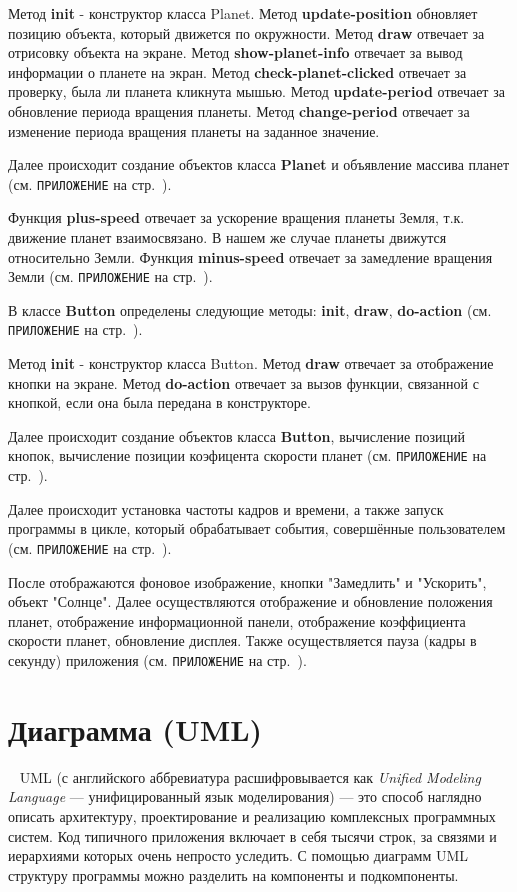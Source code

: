 \documentclass[14pt, oneside]{altsu-report}
\begin{document}
Метод \textbf{init} - конструктор класса Planet. Метод \textbf{update-position} обновляет позицию объекта, который движется по окружности. Метод \textbf{draw} отвечает за отрисовку объекта на экране. Метод \textbf{show-planet-info} отвечает за вывод информации о планете на экран. Метод \textbf{check-planet-clicked} отвечает за проверку, была ли планета кликнута мышью. Метод \textbf{update-period} отвечает за обновление периода вращения планеты. Метод \textbf{change-period} отвечает за изменение периода вращения планеты на заданное значение.

Далее происходит создание объектов класса \textbf{Planet} и объявление массива планет (см. \texttt{ПРИЛОЖЕНИЕ} на стр.~\pageref{code:solar-sys}).

Функция \textbf{plus-speed} отвечает за ускорение вращения планеты Земля, т.к. движение планет взаимосвязано. В нашем же случае планеты движутся относительно Земли. Функция \textbf{minus-speed} отвечает за замедление вращения Земли (см. \texttt{ПРИЛОЖЕНИЕ} на стр.~\pageref{code:solar-sys}).

В классе \textbf{Button} определены следующие методы: \textbf{init}, \textbf{draw}, \textbf{do-action} (см. \texttt{ПРИЛОЖЕНИЕ} на стр.~\pageref{code:solar-sys}).

Метод \textbf{init} - конструктор класса Button. Метод \textbf{draw} отвечает за отображение кнопки на экране. Метод \textbf{do-action} отвечает за вызов функции, связанной с кнопкой, если она была передана в конструкторе.

Далее происходит создание объектов класса \textbf{Button}, вычисление позиций кнопок, вычисление позиции коэфицента скорости планет (см. \texttt{ПРИЛОЖЕНИЕ} на стр.~\pageref{code:solar-sys}).

Далее происходит установка частоты кадров и времени, а также запуск программы в цикле, который обрабатывает события, совершённые пользователем (см. \texttt{ПРИЛОЖЕНИЕ} на стр.~\pageref{code:solar-sys}).

После отображаются фоновое изображение, кнопки "Замедлить" и "Ускорить", объект "Солнце". Далее осуществляются отображение и обновление положения планет, отображение информационной панели, отображение коэффициента скорости планет, обновление дисплея. Также осуществляется пауза (кадры в секунду) приложения (см. \texttt{ПРИЛОЖЕНИЕ} на стр.~\pageref{code:solar-sys}).

\section{Диаграмма (UML)}~\label{uml}
UML (с английского аббревиатура расшифровывается как \textit{Unified Modeling Language} — унифицированный язык моделирования) — это способ наглядно описать архитектуру, проектирование и реализацию комплексных программных систем. Код типичного приложения включает в себя тысячи строк, за связями и иерархиями которых очень непросто уследить. С помощью диаграмм UML структуру программы можно разделить на компоненты и подкомпоненты.
\end{document}
